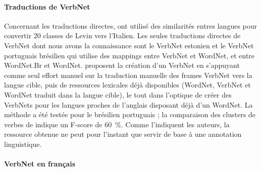 \paragraph{Traductions de VerbNet}

Concernant les traductions directes, \cite{merlo2002multilingual} ont utilisé
des similarités entres langues pour convertir 20 classes de Levin vers
l'Italien. Les seules traductions directes de VerbNet dont nous avons la
connaissance sont le VerbNet estonien \citep{jentson2014verbnet} et le VerbNet
portuguais brésilien \citep{scarton2012towards} qui utilise des mappings entre
VerbNet et WordNet, et entre WordNet.Br et WordNet. \cite{scarton2014using}
proposent la création d'un VerbNet en s'appuyant comme seul effort manuel sur
la traduction manuelle des frames VerbNet vers la langue cible, puis de
ressources lexicales déjà disponibles (WordNet, VerbNet et WordNet traduit dans
la langue cible), le tout dans l'optique de créer des VerbNets pour les langues
proches de l'anglais disposant déjà d'un WordNet.  La méthode a été testée pour
le brésilien portuguais ; la comparaison des clusters de verbes de
\citep{scarton2012towards} indique un F-score de 60~\%.  Comme l'indiquent les
auteurs, la ressource obtenue ne peut pour l'instant que servir de base à une
annotation linguistique.

\paragraph{VerbNet en français}

